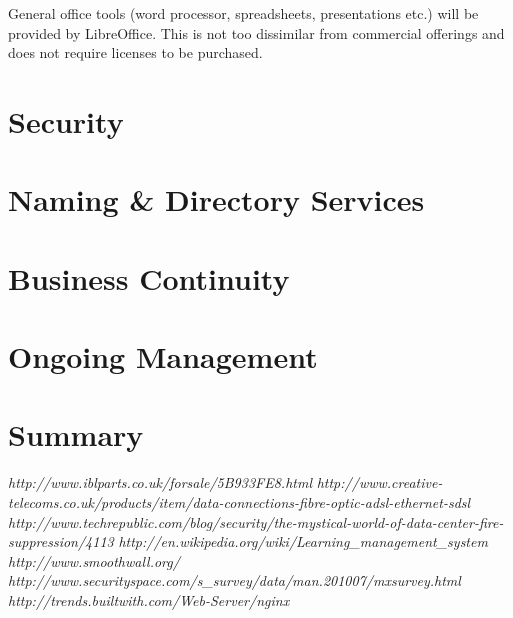 \documentclass[a4paper, twoside]{article}
\begin{document}
General office tools (word processor, spreadsheets, presentations etc.) will be
provided by LibreOffice. This is not too dissimilar from commercial offerings
and does not require licenses to be purchased.

\section{Security}
\label{sec:security}

\section{Naming \& Directory Services}

\section{Business Continuity}

\section{Ongoing Management}

\section{Summary}

\begin{thebibliography}{1}

 {\em http://www.iblparts.co.uk/forsale/5B933FE8.html}
 {\em
  http://www.creative-telecoms.co.uk/products/item/data-connections-fibre-optic-adsl-ethernet-sdsl}
 {\em
  http://www.techrepublic.com/blog/security/the-mystical-world-of-data-center-fire-suppression/4113}
 {\em http://en.wikipedia.org/wiki/Learning\_management\_system}
 {\em http://www.smoothwall.org/}
 {\em http://www.securityspace.com/s\_survey/data/man.201007/mxsurvey.html}
 {\em http://trends.builtwith.com/Web-Server/nginx}

\end{thebibliography}
\end{document}
